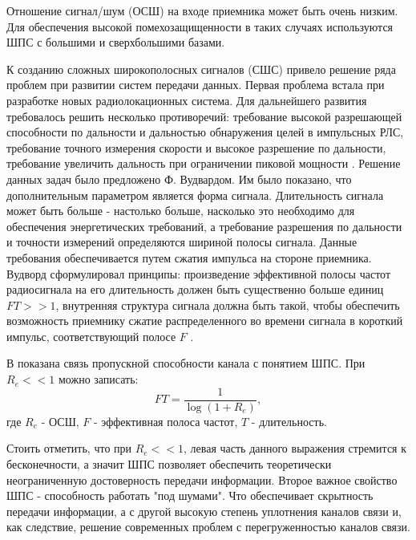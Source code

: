 Отношение сигнал/шум (ОСШ) на входе приемника может быть очень низким. Для обеспечения высокой помехозащищенности 
в таких случаях используются ШПС с большими и сверхбольшими базами.

К созданию сложных широкополосных сигналов (СШС) привело решение ряда проблем при развитии систем передачи данных.
Первая проблема встала при разработке новых радиолокационных система. Для дальнейшего развития требовалось
решить несколько противоречий: требование высокой разрешающей способности по дальности и дальностью обнаружения
целей в импульсных РЛС, требование точного измерения скорости и высокое разрешение по дальности, требование
увеличить дальность при ограничении пиковой мощности \cite{gantmaher-book}. Решение данных задач было предложено
Ф. Вудвардом. Им было показано, что дополнительным параметром является форма сигнала. Длительность сигнала
может быть больше - настолько больше, насколько это необходимо для обеспечения энергетических требований, а требование
разрешения по дальности и точности измерений определяются шириной полосы сигнала. Данные требования обеспечивается
путем сжатия импульса на стороне приемника. Вудворд сформулировал принципы: произведение эффективной полосы частот
радиосигнала на его длительность должен быть существенно больше единиц ${FT>>1}$, внутренняя структура сигнала
должна быть такой, чтобы обеспечить возможность приемнику сжатие распределенного во времени сигнала в короткий импульс,
соответствующий полосе ${F}$ \cite{gantmaher-book}.

В \cite{gantmaher-book} показана связь пропускной способности канала с понятием ШПС. При ${R_e<<1}$ можно записать:
\begin{equation}
	FT = \frac{1}{\log(1+R_e)}, \nonumber
\end{equation}
где ${R_e}$ - ОСШ, ${F}$ - эффективная полоса частот, ${T}$ - длительность.

Стоить отметить, что при ${R_e<<1}$, левая часть данного выражения стремится к бесконечности, а значит
ШПС позволяет обеспечить теоретически неограниченную достоверность передачи информации. Второе важное свойство
ШПС - способность работать "под шумами". Что обеспечивает скрытность
передачи информации, а с другой высокую степень уплотнения каналов связи и, как следствие, решение современных проблем
с перегруженностью каналов связи.

